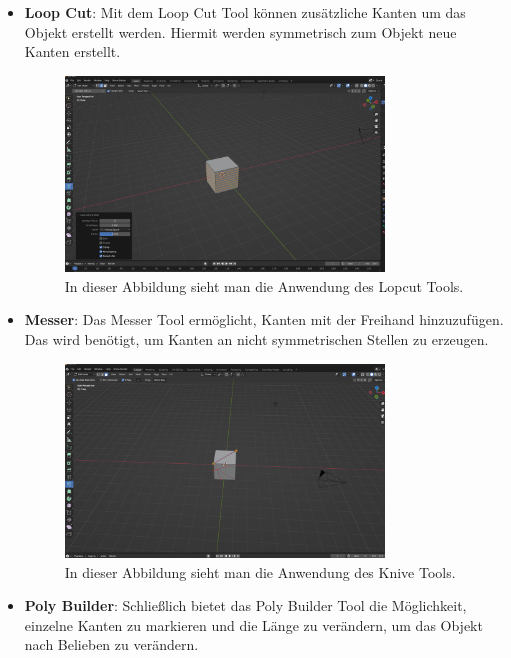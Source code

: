 \begin{itemize}
    \item \textbf{Loop Cut}:
    \indent Mit dem Loop Cut Tool können zusätzliche Kanten um das Objekt erstellt werden. Hiermit werden symmetrisch zum Objekt neue Kanten erstellt.
    \begin{figure}[H]
        \centering
        \includegraphics[width=0.8\textwidth]{chapters/13/images/Loopcut.png}
        \caption{In dieser Abbildung sieht man die Anwendung des Lopcut Tools.}
        \label{UST-11}
    \end{figure}
    \item \textbf{Messer}:
    \indent Das Messer Tool ermöglicht, Kanten mit der Freihand hinzuzufügen. Das wird benötigt, um Kanten an nicht symmetrischen Stellen zu erzeugen.
    \begin{figure}[H]
        \centering
        \includegraphics[width=0.8\textwidth]{chapters/13/images/KniveTool.png}
        \caption{In dieser Abbildung sieht man die Anwendung des Knive Tools.}
        \label{UST-12}
    \end{figure}
    \item \textbf{Poly Builder}: 
    \indent Schließlich bietet das Poly Builder Tool die Möglichkeit, einzelne Kanten zu markieren und die Länge zu verändern, um das Objekt nach Belieben zu verändern.
    \begin{figure}[H]

\end{figure}
\end{itemize}
